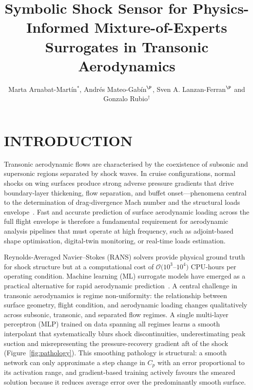 \documentclass{WCCM-ECCOMAS_2026_Full_Paper}
\title{Symbolic Shock Sensor for Physics-Informed Mixture-of-Experts Surrogates in Transonic Aerodynamics}
\author{Marta Arnabat-Martín$^{*}$, Andrés Mateo-Gabín$^{\P}$, Sven A. Lanzan-Ferran$^{\P}$ and Gonzalo Rubio$^{\dag}$}
\begin{document}
\maketitle

\section{INTRODUCTION}

Transonic aerodynamic flows are characterised by the coexistence of
subsonic and supersonic regions separated by shock waves.  In cruise
configurations, normal shocks on wing surfaces produce strong adverse
pressure gradients that drive boundary-layer thickening, flow
separation, and buffet onset---phenomena central to the determination
of drag-divergence Mach number and the structural loads
envelope~\cite{Vassberg2008,Levy2013}.  Fast and accurate prediction
of surface aerodynamic loading across the full flight envelope is
therefore a fundamental requirement for aerodynamic analysis pipelines
that must operate at high frequency, such as adjoint-based shape
optimisation, digital-twin monitoring, or real-time loads estimation.

Reynolds-Averaged Navier--Stokes (RANS) solvers provide physical
ground truth for shock structure but at a computational cost of
$\mathcal{O}(10^{3}$--$10^{4})$ CPU-hours per operating condition.
Machine learning (ML) surrogate models have emerged as a practical
alternative for rapid aerodynamic
prediction~\cite{Han2018,Bhatnagar2019,Sekar2019}.  A central
challenge in transonic aerodynamics is regime non-uniformity: the
relationship between surface geometry, flight condition, and
aerodynamic loading changes qualitatively across subsonic, transonic,
and separated flow regimes.  A single multi-layer perceptron (MLP)
trained on data spanning all regimes learns a smooth interpolant that
systematically blurs shock discontinuities, underestimating peak
suction and misrepresenting the pressure-recovery gradient aft of the
shock (Figure~\ref{fig:pathology}).  This smoothing pathology is
structural: a smooth network can
only approximate a step change in $C_p$ with an error proportional to
its activation range, and gradient-based training actively favours
the smeared solution because it reduces average error over the
predominantly smooth surface.
\end{document}
